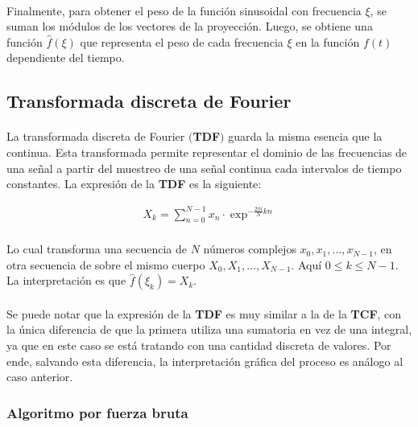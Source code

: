 \documentclass[12pt, twocolumn]{article}
\begin{document}
	\paragraph{}Finalmente, para obtener el peso de la función sinusoidal con frecuencia $\xi$, se suman los módulos de los vectores de la proyección. Luego, se obtiene una función $\hat{f}(\xi)$ que representa el peso de cada frecuencia $\xi$ en la función $f(t)$ dependiente del tiempo.
	
	\subsection{Transformada discreta de Fourier}
	
	\paragraph{} La transformada discreta de Fourier $($\textbf{TDF}$)$ guarda la misma esencia que la continua. Esta transformada permite representar el dominio de las frecuencias de una señal a partir del muestreo de una señal continua cada intervalos de tiempo constantes. La expresión de la \textbf{TDF} es la siguiente:  
	
	\begin{align}
		X_{k} = \sum_{n=0}^{N-1}x_{n}\cdot\exp^{-\frac{2\pi i}{N}k n}
	\end{align}
	
	\paragraph{} Lo cual transforma una secuencia de $N$ números complejos $x_{0},x_{1},\dots,x_{N-1}$, en otra secuencia de sobre el mismo cuerpo $X_{0},X_{1},\dots,X_{N-1}$. Aquí $0\le k\le N-1$. La interpretación es que $\hat{f}(\xi_{k})=X_{k}$.
	
	\paragraph{} Se puede notar que la expresión de la \textbf{TDF} es muy similar a la de la \textbf{TCF}, con la única diferencia de que la primera utiliza una sumatoria en vez de una integral, ya que en este caso se está tratando con una cantidad discreta de valores. Por ende, salvando esta diferencia, la interpretación gráfica del proceso es análogo al caso anterior.
	
	\subsubsection{Algoritmo por fuerza bruta}
	
\end{document}
